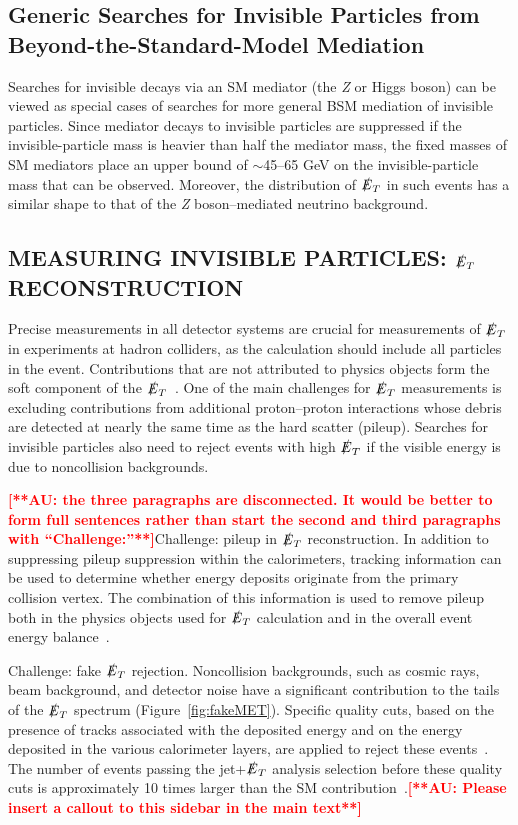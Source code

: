 \documentclass{ar-1col}
\newcommand{\IP}{invisible particle}
\newcommand{\MET}{\ensuremath{\slashed{E}_T}\xspace}
\begin{document}
\subsection{Generic Searches for Invisible Particles from Beyond-the-Standard-Model Mediation}\label{sec:results_monoXSearches}

Searches for invisible decays via an SM mediator (the \textit{Z} or Higgs boson)
can be viewed as special cases of searches for more general BSM
mediation of {\IP}s. Since mediator decays to {\IP}s are
suppressed if the invisible-particle  mass is heavier than half the mediator mass,
the fixed masses of SM mediators place an upper bound of $\sim$45--65 GeV on the invisible-particle mass that can be observed. Moreover, the
distribution of \MET in such events has a similar shape to that of
the \textit{Z} boson--mediated neutrino background.

\begin{textbox}
\section{MEASURING INVISIBLE PARTICLES: \MET RECONSTRUCTION}

\noindent Precise measurements in all detector systems are crucial
for measurements of \MET in experiments at hadron colliders, as the
calculation should include all particles in the event.
Contributions that are not attributed to physics objects form the
soft component of the \MET~\cite{Aad:2016nrq,CMS-PAS-JME-16-004}.
One of the main challenges for \MET measurements is excluding
contributions from additional proton--proton interactions whose
debris are detected at nearly the same time as the hard scatter
(pileup). Searches for invisible particles also need to reject
events with high \MET if the visible energy is due to
noncollision backgrounds.

{\textbf{\textcolor{red}{[**AU: the three paragraphs are disconnected.  It would be better to form full sentences rather than start the second and third paragraphs with ``Challenge:''**]}}Challenge: pileup in \MET reconstruction.} In addition to
suppressing pileup suppression within the calorimeters, tracking
information can be used to determine whether energy deposits
originate from the primary collision vertex. The combination of
this information is used to remove pileup both in the physics
objects used for \MET calculation and in the overall event energy
balance~\cite{CMS-PAS-JME-16-004,ATLAS-CONF-2014-019}.

{Challenge: fake \MET rejection.} Noncollision
backgrounds, such as cosmic rays, beam background, and detector
noise have a significant contribution to the tails of the \MET
spectrum (Figure~\ref{fig:fakeMET}). Specific quality
cuts, based on the presence of tracks associated with the deposited
energy and on the energy deposited in the various calorimeter layers,
are applied to reject these events~\cite{ATLAS-CONF-2015-029}. The
number of events passing the jet+\MET analysis selection before
these quality cuts is approximately 10 times larger than the SM
contribution~\cite{Aaboud:2016tnv}.\textbf{\textcolor{red}{[**AU: Please insert a callout to this sidebar in the main text**]}}
\end{textbox}
\end{document}
